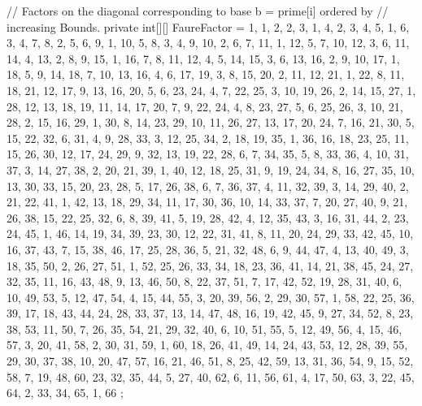 \begin{code}
\begin{hide}
{   // Factors on the diagonal corresponding to base b = prime[i] ordered by
   //  increasing Bounds.
   private int[][] FaureFactor = {{1}, {1, 2}, {2, 3, 1, 4},
      { 2, 3, 4, 5, 1, 6}, {3, 4, 7, 8, 2, 5, 6, 9, 1, 10},
      { 5, 8, 3, 4, 9, 10, 2, 6, 7, 11, 1, 12},
      { 5, 7, 10, 12, 3, 6, 11, 14, 4, 13, 2, 8, 9, 15, 1, 16},
      { 7, 8, 11, 12, 4, 5, 14, 15, 3, 6, 13, 16, 2, 9, 10, 17, 1, 18},
      { 5, 9, 14, 18, 7, 10, 13, 16, 4, 6, 17, 19, 3, 8, 15, 20, 2, 11, 12,
        21, 1, 22},
      { 8, 11, 18, 21, 12, 17, 9, 13, 16, 20, 5, 6, 23, 24, 4, 7, 22, 25, 3,
        10, 19, 26, 2, 14, 15, 27, 1, 28},
      { 12, 13, 18, 19, 11, 14, 17, 20, 7, 9, 22, 24, 4, 8, 23, 27, 5, 6, 25,
        26, 3, 10, 21, 28, 2, 15, 16, 29, 1, 30},
      { 8, 14, 23, 29, 10, 11, 26, 27, 13, 17, 20, 24, 7, 16, 21, 30, 5, 15,
        22, 32, 6, 31, 4, 9, 28, 33, 3, 12, 25, 34, 2, 18, 19, 35, 1, 36},
      { 16, 18, 23, 25, 11, 15, 26, 30, 12, 17, 24, 29, 9, 32, 13, 19, 22,
        28, 6, 7, 34, 35, 5, 8, 33, 36, 4, 10, 31, 37, 3, 14, 27, 38, 2, 20,
        21, 39, 1, 40},
      { 12, 18, 25, 31, 9, 19, 24, 34, 8, 16, 27, 35, 10, 13, 30, 33, 15, 20,
        23, 28, 5, 17, 26, 38, 6, 7, 36, 37, 4, 11, 32, 39, 3, 14, 29, 40, 2,
        21, 22, 41, 1, 42},
      { 13, 18, 29, 34, 11, 17, 30, 36, 10, 14, 33, 37, 7, 20, 27, 40, 9, 21,
        26, 38, 15, 22, 25, 32, 6, 8, 39, 41, 5, 19, 28, 42, 4, 12, 35, 43,
        3, 16, 31, 44, 2, 23, 24, 45, 1, 46},
      { 14, 19, 34, 39, 23, 30, 12, 22, 31, 41, 8, 11, 20, 24, 29, 33, 42, 45,
        10, 16, 37, 43, 7, 15, 38, 46, 17, 25, 28, 36, 5, 21, 32, 48, 6, 9,
        44, 47, 4, 13, 40, 49, 3, 18, 35, 50, 2, 26, 27, 51, 1, 52},
      { 25, 26, 33, 34, 18, 23, 36, 41, 14, 21, 38, 45, 24, 27, 32, 35, 11,
        16, 43, 48, 9, 13, 46, 50, 8, 22, 37, 51, 7, 17, 42, 52, 19, 28, 31,
        40, 6, 10, 49, 53, 5, 12, 47, 54, 4, 15, 44, 55, 3, 20, 39, 56, 2,
        29, 30, 57, 1, 58},
      { 22, 25, 36, 39, 17, 18, 43, 44, 24, 28, 33, 37, 13, 14, 47, 48, 16,
        19, 42, 45, 9, 27, 34, 52, 8, 23, 38, 53, 11, 50, 7, 26, 35, 54, 21,
        29, 32, 40, 6, 10, 51, 55, 5, 12, 49, 56, 4, 15, 46, 57, 3, 20, 41,
        58, 2, 30, 31, 59, 1, 60},
      { 18, 26, 41, 49, 14, 24, 43, 53, 12, 28, 39, 55, 29, 30, 37, 38, 10,
        20, 47, 57, 16, 21, 46, 51, 8, 25, 42, 59, 13, 31, 36, 54, 9, 15,
        52, 58, 7, 19, 48, 60, 23, 32, 35, 44, 5, 27, 40, 62, 6, 11, 56,
        61, 4, 17, 50, 63, 3, 22, 45, 64, 2, 33, 34, 65, 1, 66}
};


}
\end{hide}
\end{code}
